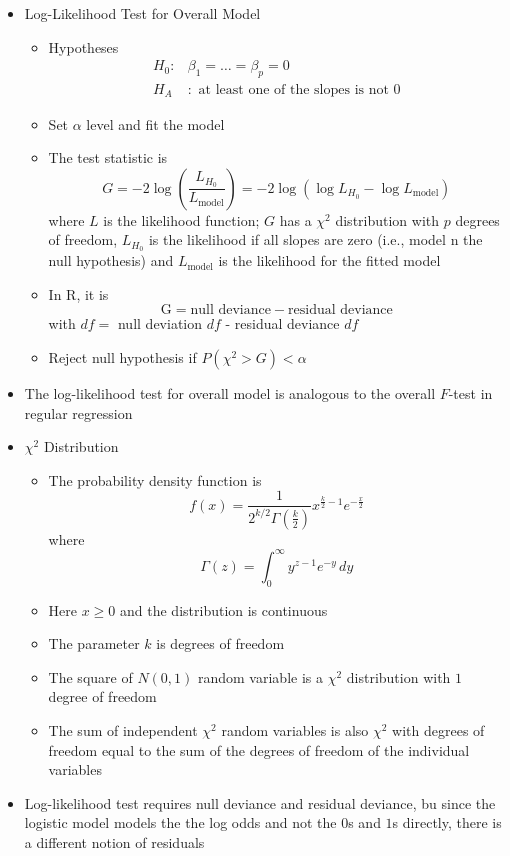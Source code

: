 \documentclass[12pt]{article}
\begin{document}
\begin{itemize}
\item Log-Likelihood Test for Overall Model \begin{itemize} 
\item Hypotheses $$ \begin{aligned} H_0:& \beta_1 = \dots = \beta_p = 0 \\ H_A &: \text{ at least one of the slopes is not } 0 \end{aligned} $$ 
\item Set $\alpha$ level and fit the model
\item The test statistic is $$ G = -2 \log\left( \frac{L_{H_0}}{L_{\text{model}}} \right) = -2\log(\log L_{H_0} - \log L_{\text{model}}) $$ where $L$ is the likelihood function; $G$ has a $\chi^2$ distribution with $p$ degrees of freedom, $L_{H_0}$ is the likelihood if all slopes are zero (i.e., model n the null hypothesis) and $L_{\text{model}}$ is the likelihood for the fitted model 
\item In R, it is $$ \text{G} = \text{null deviance} - \text{residual deviance} $$ with $df = $ null deviation $df$ - residual deviance $df$ 
\item Reject null hypothesis if $P(\chi^2 > G) < \alpha$ \end{itemize} 
\item The log-likelihood test for overall model is analogous to the overall $F$-test in regular regression 
\item $\chi^2$ Distribution \begin{itemize} 
\item The probability density function is $$ f(x) = \frac{1}{2^{k/2} \Gamma\left( \frac{k}{2} \right) } x^{\frac{k}{2} - 1} e^{-\frac{x}{2}} $$ where $$ \Gamma(z) = \int_0^\infty y^{z-1}e^{-y} \, dy $$ 
\item Here $x \geq 0$ and the distribution is continuous 
\item The parameter $k$ is degrees of freedom 
\item The square of $N(0,1)$ random variable is a $\chi^2$ distribution with $1$ degree of freedom 
\item The sum of independent $\chi^2$ random variables is also $\chi^2$ with degrees of freedom equal to the sum of the degrees of freedom of the individual variables \end{itemize} 
\item Log-likelihood test requires null deviance and residual deviance, bu since the logistic model models the the log odds and not the $0$s and $1$s directly, there is a different notion of residuals 

\end{itemize}
\end{document}
